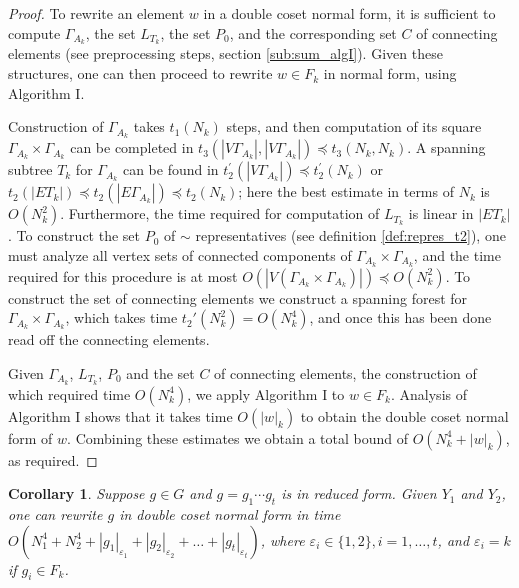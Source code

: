 \documentclass[a4paper,12pt]{article}
\newcommand{\G}{\Gamma }
\newcommand{\e}{\varepsilon }
\newtheorem{corollary}[theorem]{Corollary}
\numberwithin{equation}{section}
\numberwithin{figure}{section}
\begin{document}
\begin{proof}
To rewrite an element $w$ in a double coset normal form, it is
sufficient to compute $\G_{A_k}$, the set $L_{T_k}$,
the set $P_0$, and the
corresponding  set $C$ of connecting elements (see preprocessing steps, section \ref{sub:sum_algI}).
 Given these structures, one can then proceed to rewrite $w \in
F_k$ in normal form, using Algorithm I.

Construction of $\G_{A_k}$ takes  $t_1(N_k)$ steps, and then
computation of its square
 $\G_{A_k} \times \G_{A_k}$ can be completed in
 $t_3(|V\G_{A_k}|,|V\G_{A_k}|) \preceq t_3(N_k,N_k)$.
A spanning subtree $T_k$ for $\G_{A_k}$ can be found in
$t^{\prime}_2(|V\G_{A_k}|) \preceq t^{\prime}_2(N_k)$ or $t_2(|E
T_k|) \preceq t_2(|E\G_{A_k}|) \preceq t_2(N_k)$; here the best
estimate in terms of $N_k$ is $O(N_k^2)$. Furthermore, the time
required for computation of $L_{T_k}$ is linear in $|E T_k|$.
To construct the set $P_0$ of $\sim$
representatives (see definition \ref{def:repres_t2}), one must
analyze all vertex sets of connected components of $\G_{A_k}
\times \G_{A_k}$, and the time  required for this procedure is at
most $O(|V(\G_{A_k} \times \G_{A_k})|) \preceq O(N^2_k)$. To construct
the set of connecting elements we construct a spanning forest for
$\G_{A_k} \times \G_{A_k}$, which takes time $t_2'(N_k^2)
=O(N_k^4)$, and once this
has been done read off the connecting elements.

Given $\G_{A_k}$, $L_{T_k}$, $P_0$ and the set $C$ of connecting elements,
the construction of which required time
 $O(N^4_k)$,
 we apply Algorithm I to $w \in F_k$. Analysis
of Algorithm I shows that it takes time  $O(|w|_k)$  to obtain
the double coset normal form of $w$. Combining these estimates
 we obtain a total bound of $O(N^4_k + |w|_k)$, as required.
\end{proof}

\begin{corollary}\label{cor:dcnf_time} Suppose $g \in G$ and $g=g_1 \cdots g_t$ is in reduced
form. Given $Y_1$ and $Y_2$, one can rewrite $g$ in double coset normal
form in time  $O(N^4_1+ N^4_2 + |g_1|_{\e_1}+|g_2|_{\e_2}+
\ldots +|g_t|_{\e_t})$, where $\e_i \in \{ 1, 2\}, i = 1, \ldots,
t$, and $\e_i = k$ if $g_i \in F_k$.
\end{corollary}
\end{document}
